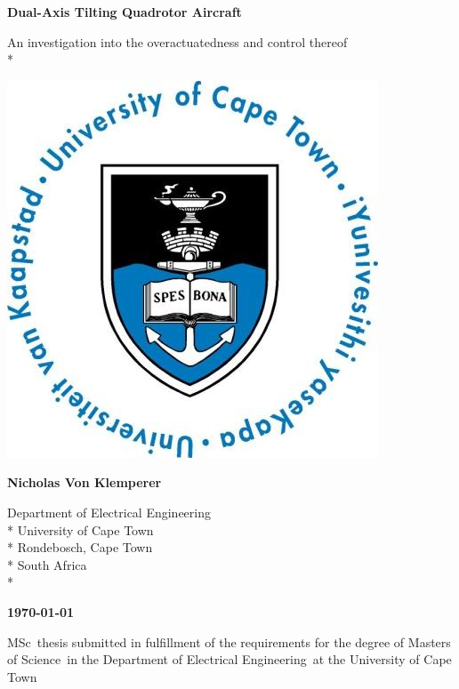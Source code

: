 \documentclass[a4paper, 11pt, oneside, openright, parskip=full]{book}
\newcommand{\auth}{Nicholas Von Klemperer}								%
\newcommand{\titl}{Dual-Axis Tilting Quadrotor Aircraft}						%
\newcommand{\subtitle}{An investigation into the overactuatedness and control thereof}						%
\newcommand{\dept}{Department of Electrical Engineering}%
\newcommand{\uni}{University of Cape Town}				%
\newcommand{\city}{Rondebosch, Cape Town}				%
\newcommand{\country}{South Africa}						%
\newcommand{\degre}{Masters of Science}				%
\newcommand{\degreeabv}{MSc}							%
\newcommand{\supervisor}{Supervisor}					%
\newcommand{\logo}										%
{	
	\includegraphics[scale = 0.3]{figs/uctLogo}
}
\begin{document}
\setcounter{MaxMatrixCols}{20}
\begin{titlepage}
	\centering
	\vspace*{1cm}

	\begin{Huge}					
		\bfseries\titl\par
		\vskip 5mm
	\end{Huge}
	\begin{Large}					
		\subtitle\\*
		\vskip 3cm
	\end{Large}
	\logo							
	\vskip 1.5cm	
	\begin{Large}					
		\bfseries\auth\\
	\end{Large}
	\begin{normalsize}				
		\vskip 2mm	
		\dept\\*
		\uni\\*
		\city\\*
		\country\\*
		
		\vskip 15mm	
	\end{normalsize}
	\begin{Large}					
		{\bfseries \mydate\today}
		\vskip 15mm	
	\end{Large}
		\degreeabv\ thesis submitted in fulfillment of the requirements for the degree of \degre\ in the \dept\ at the \uni
		

\end{titlepage}
\end{document}
